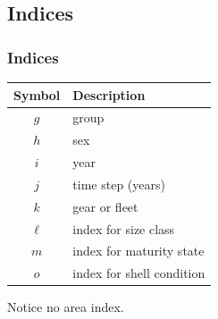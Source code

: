 \documentclass{beamer}
\begin{document}

\subsection{Indices}
\begin{frame}
\frametitle{Indices}
\begin{table}
  \centering
  \begin{tabular}{cl}
  \hline
  Symbol  & Description \\
  \hline
      $g$ & group \\
      $h$ & sex \\
      $i$ & year \\
      $j$ & time step (years) \\
      $k$ & gear or fleet \\
      $\ell$ & index for size class \\
      $m$ & index for maturity state \\
      $o$ & index for shell condition \\
  \hline
  \end{tabular}
\end{table}
Notice no area index.
\end{frame}

\end{document}
